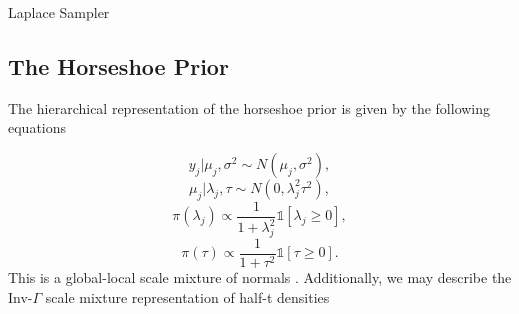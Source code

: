 			\begin{algorithm}[H]
{}
\caption{Laplace Sampler}\label{psd:laplace_sampler}
			\end{algorithm}
		
		\subsection{The Horseshoe Prior}\label{sec:horseshoe_app}
The hierarchical representation of the horseshoe prior \cite{carvalho2010horseshoe} is given by the following equations

 \begin{equation}\label{eqn:horseshoe1}
 y_j\vert\mu_j, \sigma^2 \sim N(\mu_j, \sigma^2),
 \end{equation}  
 \begin{equation}\label{eqn:horseshoe2}
 \mu_j\vert\lambda_j,\tau \sim N(0, \lambda_j^2 \tau^2 ),
 \end{equation}  
  \begin{equation}\label{eqn:horseshoe3}
  \pi(\lambda_j)\propto \frac{1}{1+\lambda_j^2}\mathds{1}[\lambda_j\geq 0],
 \end{equation} 
   \begin{equation}\label{eqn:horseshoe4}
  \pi(\tau)\propto \frac{1}{1+\tau^2}\mathds{1}[\tau\geq 0].
 \end{equation} 
 This is a global-local scale mixture of normals \cite{polson2010shrink}. Additionally, we may describe the Inv-$\Gamma$ scale mixture representation of half-t densities \cite{gelman2006prior} 

